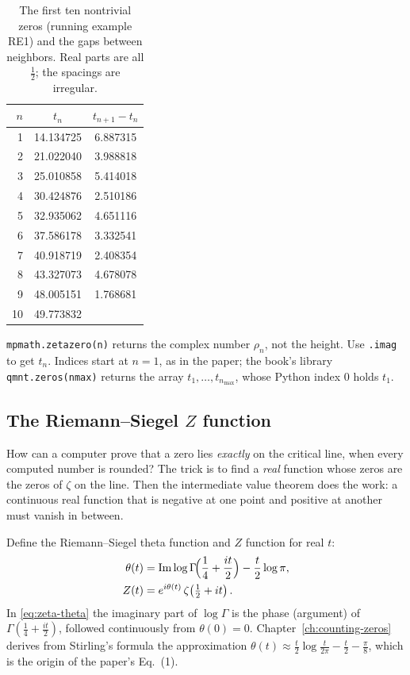 \begin{table}[htbp]\centering
\caption{The first ten nontrivial zeros (running example RE1) and the gaps between neighbors. Real parts are all $\tfrac12$; the spacings are irregular.}
\label{tab:zeta-zeros}
\begin{tabular}{rcc}
\toprule
$n$ & $t_n$ & $t_{n+1}-t_n$\\
\midrule
1 & 14.134725 & 6.887315\\
2 & 21.022040 & 3.988818\\
3 & 25.010858 & 5.414018\\
4 & 30.424876 & 2.510186\\
5 & 32.935062 & 4.651116\\
6 & 37.586178 & 3.332541\\
7 & 40.918719 & 2.408354\\
8 & 43.327073 & 4.678078\\
9 & 48.005151 & 1.768681\\
10 & 49.773832 & \\
\bottomrule
\end{tabular}
\end{table}

\begin{pitfall}
\texttt{mpmath.zetazero(n)} returns the complex number $\rho_n$, not the height. Use \texttt{.imag} to get $t_n$. Indices start at $n=1$, as in the paper; the book's library \texttt{qmnt.zeros(nmax)} returns the array $t_1,\dots,t_{n_{\max}}$, whose Python index 0 holds $t_1$.
\end{pitfall}

\subsection{The Riemann--Siegel $Z$ function}

How can a computer prove that a zero lies \emph{exactly} on the critical line, when every computed number is rounded? The trick is to find a \emph{real} function whose zeros are the zeros of $\zeta$ on the line. Then the intermediate value theorem does the work: a continuous real function that is negative at one point and positive at another must vanish in between.

Define the Riemann--Siegel theta function and $Z$ function for real $t$:
\begin{align}
\theta(t)&=\Im\log\Gamma\!\Bigl(\frac14+\frac{it}{2}\Bigr)-\frac t2\log\pi, \label{eq:zeta-theta}\\
Z(t)&=e^{i\theta(t)}\,\zeta\!\left(\tfrac12+it\right).\label{eq:zeta-Z}
\end{align}
In \cref{eq:zeta-theta} the imaginary part of $\log\Gamma$ is the phase (argument) of $\Gamma(\tfrac14+\tfrac{it}{2})$, followed continuously from $\theta(0)=0$. Chapter~\ref{ch:counting-zeros} derives from Stirling's formula the approximation $\theta(t)\approx\frac t2\log\frac{t}{2\pi}-\frac t2-\frac\pi8$, which is the origin of the paper's Eq.~(1).

